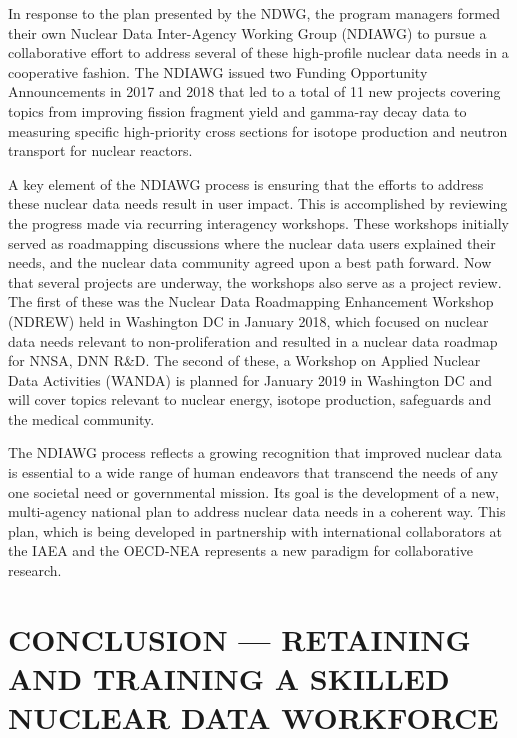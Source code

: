 \documentclass[letterpaper]{ar-1col}
\begin{document}
In response to the plan presented by the NDWG, the program managers formed their own Nuclear Data Inter-Agency Working Group (NDIAWG) to pursue a collaborative effort to address several of these high-profile nuclear data needs in a cooperative fashion.  The NDIAWG issued two Funding Opportunity Announcements in 2017 and 2018 that led to a total of 11 new projects covering topics from improving fission fragment yield and gamma-ray decay data to measuring specific high-priority cross sections for isotope production and neutron transport for nuclear reactors.   

A key element of the NDIAWG process is ensuring that the efforts to address these nuclear data needs result in user impact.  This is accomplished by reviewing the progress made via recurring interagency workshops.  These workshops initially served as roadmapping discussions where the nuclear data users explained their needs, and the nuclear data community agreed upon a best path forward.  Now that several projects are underway, the workshops also serve as a project review. The first of these was the Nuclear Data Roadmapping Enhancement Workshop (NDREW) held in Washington DC in January 2018, which focused on nuclear data needs relevant to non-proliferation \cite{Ndr18} and resulted in a nuclear data roadmap for NNSA, DNN R\&D.  The second of these, a Workshop on Applied Nuclear Data Activities (WANDA) is planned for January 2019 in Washington DC and will cover topics relevant to nuclear energy, isotope production, safeguards and the medical community.  

The NDIAWG process reflects a growing recognition that improved nuclear data is essential to a wide range of human endeavors that transcend the needs of any one societal need or governmental mission.  Its goal is the development of a new, multi-agency national plan to address nuclear data needs in a coherent way.  This plan, which is being developed in partnership with international collaborators at the IAEA and the OECD-NEA represents a new paradigm for collaborative research.  

\section{CONCLUSION \texorpdfstring{---}{-} RETAINING AND TRAINING A SKILLED NUCLEAR DATA WORKFORCE}
\end{document}
